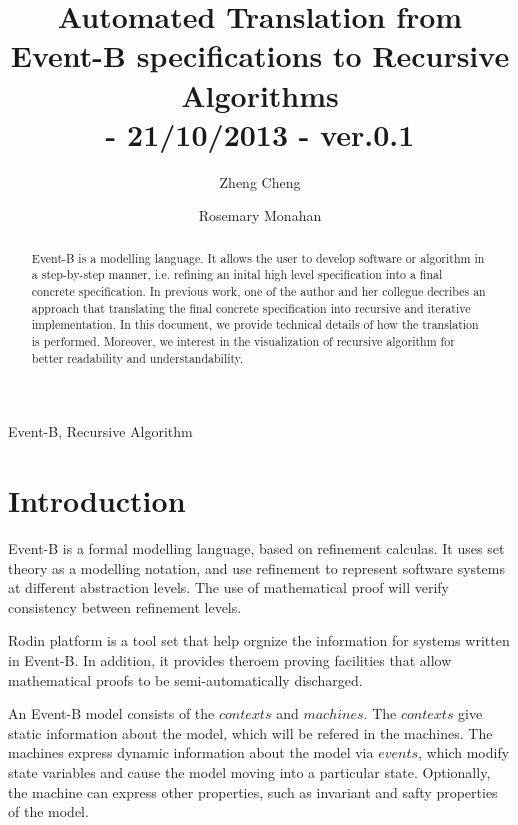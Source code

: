 \documentclass{easychair}
\newenvironment{keywords}{
       \list{}{\advance\topsep by0.35cm\relax\small
       \leftmargin=1cm
       \labelwidth=0.35cm
       \listparindent=0.35cm
       \itemindent\listparindent
       \rightmargin\leftmargin}\item[\hskip\labelsep
                                     \bfseries Keywords:]}
     {\endlist}
\begin{document}
\pagestyle{plain}

\title{Automated Translation from Event-B specifications to Recursive Algorithms
\\\small{- 21/10/2013 - ver.0.1} 
}
\author{
Zheng Cheng \and
Rosemary Monahan 
}


\maketitle  

\begin{abstract}
Event-B is a modelling language. It allows the user to develop software or algorithm in a step-by-step manner, i.e. refining an inital high level specification into a final concrete specification. In previous work, one of the author and her collegue decribes an approach that translating the final concrete specification into recursive and iterative implementation. In this document, we provide technical details of how the translation is performed. Moreover, we interest in the visualization of recursive algorithm for better readability and understandability.
 
\end{abstract}   

\begin{keywords}
 Event-B,
 Recursive Algorithm
\end{keywords}

\section{Introduction} %
Event-B is a formal modelling language, based on refinement calculas. It uses set theory as a modelling notation, and use refinement to represent software systems at different abstraction levels. The use of mathematical proof will verify consistency between refinement levels.

Rodin platform is a tool set that help orgnize the information for systems written in Event-B. In addition, it provides theroem proving facilities that allow mathematical proofs to be semi-automatically discharged.

An Event-B model consists of the $contexts$ and $machines$. The $contexts$ give static information about the model, which will be refered in the machines. The machines express dynamic information about the model via $events$, which modify state variables and cause the model moving into a particular state. Optionally, the machine can express other properties, such as invariant and safty properties of the model.
\end{document}
